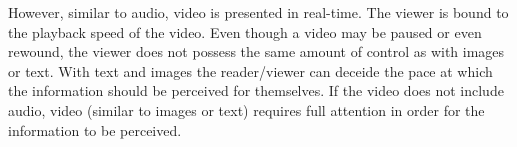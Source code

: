 However, similar to audio, video is presented in real-time. The viewer is bound to the playback speed of the video. Even though a video may be paused or even rewound, the viewer does not possess the same amount of control as with images or text. With text and images the reader/viewer can deceide the pace at which the information should be perceived for themselves. If the video does not include audio, video (similar to images or text) requires full attention in order for the information to be perceived.